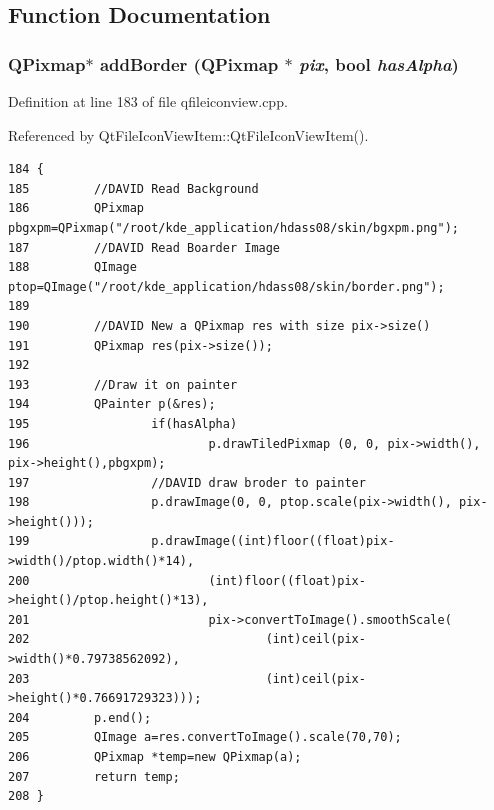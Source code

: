 \subsection{Function Documentation}
\subsubsection{\setlength{\rightskip}{0pt plus 5cm}QPixmap$\ast$ add\-Border (QPixmap $\ast$ {\em pix}, bool {\em has\-Alpha})}\label{qfileiconview_8h_a2}




Definition at line 183 of file qfileiconview.cpp.

Referenced by Qt\-File\-Icon\-View\-Item::Qt\-File\-Icon\-View\-Item().



\footnotesize\begin{verbatim}184 {
185         //DAVID Read Background
186         QPixmap pbgxpm=QPixmap("/root/kde_application/hdass08/skin/bgxpm.png");
187         //DAVID Read Boarder Image
188         QImage ptop=QImage("/root/kde_application/hdass08/skin/border.png");
189         
190         //DAVID New a QPixmap res with size pix->size()
191         QPixmap res(pix->size());
192         
193         //Draw it on painter
194         QPainter p(&res);
195                 if(hasAlpha) 
196                         p.drawTiledPixmap (0, 0, pix->width(), pix->height(),pbgxpm);
197                 //DAVID draw broder to painter          
198                 p.drawImage(0, 0, ptop.scale(pix->width(), pix->height()));
199                 p.drawImage((int)floor((float)pix->width()/ptop.width()*14),
200                         (int)floor((float)pix->height()/ptop.height()*13),
201                         pix->convertToImage().smoothScale(
202                                 (int)ceil(pix->width()*0.79738562092),
203                                 (int)ceil(pix->height()*0.76691729323)));
204         p.end();
205         QImage a=res.convertToImage().scale(70,70);
206         QPixmap *temp=new QPixmap(a);
207         return temp;
208 }
\end{verbatim}\normalsize 
